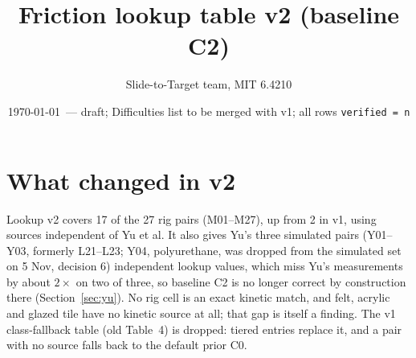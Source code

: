 \documentclass[11pt]{article}
\title{Friction lookup table v2 (baseline C2)}
\author{Slide-to-Target team, MIT 6.4210}
\date{\today\ --- draft; Difficulties list to be merged with v1; all rows \texttt{verified = n}}
\begin{document}
\maketitle

\noindent{}

\section{What changed in v2}
Lookup v2 covers 17 of the 27 rig pairs (M01--M27), up from 2 in v1, using sources independent of Yu et al. It also gives Yu's three simulated pairs (Y01--Y03, formerly L21--L23; Y04, polyurethane, was dropped from the simulated set on 5 Nov, decision 6) independent lookup values, which miss Yu's measurements by about $2\times$ on two of three, so baseline C2 is no longer correct by construction there (Section~\ref{sec:yu}). No rig cell is an exact kinetic match, and felt, acrylic and glazed tile have no kinetic source at all; that gap is itself a finding. The v1 class-fallback table (old Table~4) is dropped: tiered entries replace it, and a pair with no source falls back to the default prior C0.
\end{document}
